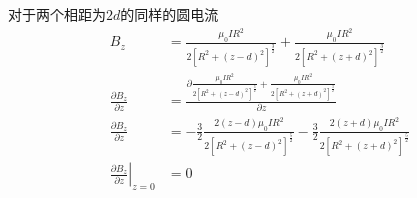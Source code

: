 对于两个相距为$2d$的同样的圆电流
\begin{align*}
    B_z&=\frac{\mu_0 IR^2}{2 \left[R^2+\left(z-d\right)^2\right]^\frac{3}{2}}+\frac{\mu_0 IR^2}{2 \left[R^2+\left(z+d\right)^2\right]^\frac{3}{2}}\\
    \frac{\partial B_z}{\partial z}
    &=
    \frac{\partial \frac{\mu_0 IR^2}{2 \left[R^2+\left(z-d\right)^2\right]^\frac{3}{2}}+\frac{\mu_0 IR^2}{2 \left[R^2+\left(z+d\right)^2\right]^\frac{3}{2}}}{\partial z}\\
    \frac{\partial B_z}{\partial z}
    &=-
    \frac{3}{2}\frac{2\left(z-d\right)\mu_0 IR^2}{2 \left[R^2+\left(z-d\right)^2\right]^\frac{5}{2}}-\frac{3}{2}\frac{2\left(z+d\right)\mu_0 IR^2}{2 \left[R^2+\left(z+d\right)^2\right]^\frac{5}{2}}\\
    \left.\frac{\partial B_z}{\partial z}\right|_{z=0}
    &=0
\end{align*}

